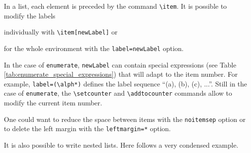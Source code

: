 \documentclass[a4paper, 12pt]{report}
\def\tbs{\textbackslash}
\begin{document}
    In a list, each element is preceded by the command \texttt{\tbs{}item}. It is possible to modify the labels
    \begin{enumerate*}
        \item individually with \texttt{\tbs{}item[newLabel]} or
        \item for the whole environment with the \texttt{label=newLabel} option.
    \end{enumerate*}

    In the case of \texttt{enumerate}, \texttt{newLabel} can contain special expressions (see Table \ref{tab:enumerate_special_expressions}) that will adapt to the item number. For example, \texttt{label=(\tbs{}alph*)} defines the label sequence \enquote{(a), (b), (c), ...}. Still in the case of \texttt{enumerate}, the  \texttt{\tbs{}setcounter} and \texttt{\tbs{}addtocounter} commands allow to modify the current item number.

    One could want to reduce the space between items with the \texttt{noitemsep} option or to delete the left margin with the \texttt{leftmargin=*} option.

    It is also possible to write nested lists. Here follows a very condensed example.
\end{document}
